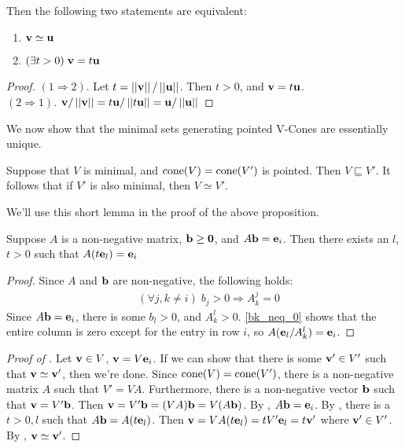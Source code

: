 \begin{Prop}\label{vector_equivalence}
  Then the following two statements are equivalent:
  \begin{enumerate}
    \item $\mathbf{v}\simeq\mathbf{u}$
    \item $(\exists t>0)\;\mathbf{v}=t\mathbf{u}$
  \end{enumerate}
\end{Prop}

\begin{proof}
  $(1\Rightarrow 2)$.  Let $t=\left|\left|\mathbf{v}\right|\right|/\left|\left|\mathbf{u}\right|\right|$.  Then $t>0$, and $\mathbf{v}=t\mathbf{u}$.\\
  $(2\Rightarrow 1)$.  $\mathbf{v}/\left|\left|\mathbf{v}\right|\right| = t\mathbf{u}/\left|\left|t\mathbf{u}\right|\right| = \mathbf{u}/\left|\left|\mathbf{u}\right|\right|$
\end{proof}

We now show that the minimal sets generating pointed V-Cones are essentially unique.

\begin{Prop}\label{min_pointed_generators}
  Suppose that $V$ is minimal, and $\operatorname{cone}(V) = \operatorname{cone}(V')$ is pointed.  Then $V\sqsubseteq V'$.  It follows that if $V'$ is also minimal, then $V\simeq V'$.
\end{Prop}

We'll use this short lemma in the proof of the above proposition.

\begin{Lemma}\label{non_negative_sums_to_e}
	Suppose $A$ is a non-negative matrix, $\mathbf{b}\geq\mathbf{0}$, and $A\mathbf{b} = \mathbf{e}_i$.  Then there exists an $l$, $t>0$ such that $A(t\mathbf{e}_l) = \mathbf{e}_i$
\end{Lemma}

\begin{proof}
	Since $A$ and $\mathbf{b}$ are non-negative, the following holds:
	\begin{align}
		 & (\forall j,k\neq i)\; b_j   > 0 \Rightarrow A_k^j = 0 \label{bk_neq_0}
	\end{align}
	Since $A\mathbf{b}=\mathbf{e}_i$, there is some $b_l > 0$, and $A_k^l > 0$.  \eqref{bk_neq_0} shows that the entire column is zero except for the entry in row $i$, so $A(\mathbf{e}_l/A_k^l) = \mathbf{e}_i$.
\end{proof}

\begin{proof}[Proof of ]
  Let $\mathbf{v}\in V$, $\mathbf{v}=V\mathbf{e}_i$.  If we can show that there is some $\mathbf{v}'\in V'$ such that $\mathbf{v}\simeq\mathbf{v}'$, then we're done.  Since $\operatorname{cone}(V)=\operatorname{cone}(V')$, there is a non-negative matrix $A$ such that $V'=VA$.  Furthermore, there is a non-negative vector $\mathbf{b}$ such that $\mathbf{v}=V'\mathbf{b}$.  Then $\mathbf{v}=V'\mathbf{b}=(VA)\mathbf{b}=V(A\mathbf{b})$.  By , $A\mathbf{b}=\mathbf{e}_i$.  By , there is a $t>0,l$ such that $A\mathbf{b}=A(t\mathbf{e}_l)$.  Then $\mathbf{v}=VA(t\mathbf{e}_l)=tV'\mathbf{e}_l=t\mathbf{v}'$ where $\mathbf{v}'\in V'$.  By , $\mathbf{v}\simeq\mathbf{v}'$.
\end{proof}

